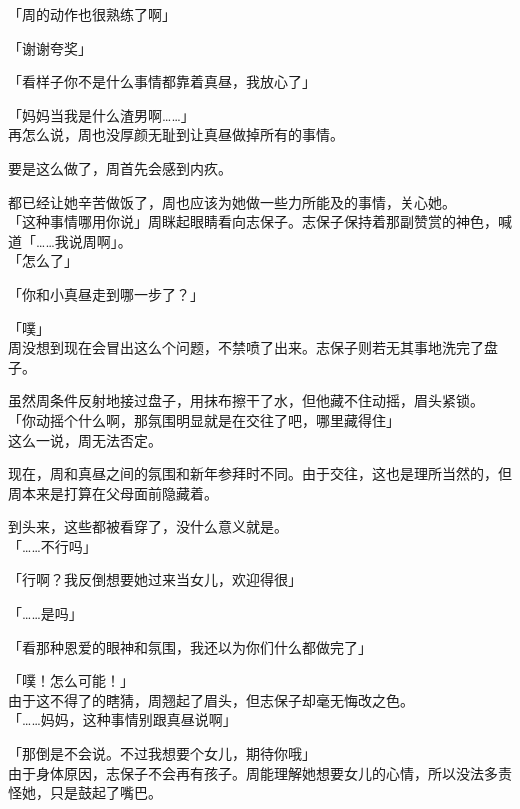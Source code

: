 「周的动作也很熟练了啊」

「谢谢夸奖」

「看样子你不是什么事情都靠着真昼，我放心了」

「妈妈当我是什么渣男啊……」\\

再怎么说，周也没厚颜无耻到让真昼做掉所有的事情。

要是这么做了，周首先会感到内疚。

都已经让她辛苦做饭了，周也应该为她做一些力所能及的事情，关心她。\\

「这种事情哪用你说」周眯起眼睛看向志保子。志保子保持着那副赞赏的神色，喊道「……我说周啊」。\\

「怎么了」

「你和小真昼走到哪一步了？」

「噗」\\

周没想到现在会冒出这么个问题，不禁喷了出来。志保子则若无其事地洗完了盘子。

虽然周条件反射地接过盘子，用抹布擦干了水，但他藏不住动摇，眉头紧锁。\\

「你动摇个什么啊，那氛围明显就是在交往了吧，哪里藏得住」\\

这么一说，周无法否定。

现在，周和真昼之间的氛围和新年参拜时不同。由于交往，这也是理所当然的，但周本来是打算在父母面前隐藏着。

到头来，这些都被看穿了，没什么意义就是。\\

「……不行吗」

「行啊？我反倒想要她过来当女儿，欢迎得很」

「……是吗」

「看那种恩爱的眼神和氛围，我还以为你们什么都做完了」

「噗！怎么可能！」\\

由于这不得了的瞎猜，周翘起了眉头，但志保子却毫无悔改之色。\\

「……妈妈，这种事情别跟真昼说啊」

「那倒是不会说。不过我想要个女儿，期待你哦」\\

由于身体原因，志保子不会再有孩子。周能理解她想要女儿的心情，所以没法多责怪她，只是鼓起了嘴巴。\\

